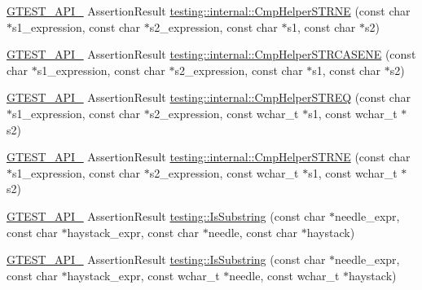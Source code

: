 \begin{DoxyCompactItemize}
\item 
\mbox{\hyperlink{_obj__test_2lib_2googletest-release-1_88_81_2googletest_2include_2gtest_2internal_2gtest-port_8h_aa73be6f0ba4a7456180a94904ce17790}{G\+T\+E\+S\+T\+\_\+\+A\+P\+I\+\_\+}} Assertion\+Result \mbox{\hyperlink{namespacetesting_1_1internal_af2d31c77ce73e1003a64bd7ca3564bbe}{testing\+::internal\+::\+Cmp\+Helper\+S\+T\+R\+NE}} (const char $\ast$s1\+\_\+expression, const char $\ast$s2\+\_\+expression, const char $\ast$s1, const char $\ast$s2)
\item 
\mbox{\hyperlink{_obj__test_2lib_2googletest-release-1_88_81_2googletest_2include_2gtest_2internal_2gtest-port_8h_aa73be6f0ba4a7456180a94904ce17790}{G\+T\+E\+S\+T\+\_\+\+A\+P\+I\+\_\+}} Assertion\+Result \mbox{\hyperlink{namespacetesting_1_1internal_a7e31d489f06ab8f6a81a7729f0c377e7}{testing\+::internal\+::\+Cmp\+Helper\+S\+T\+R\+C\+A\+S\+E\+NE}} (const char $\ast$s1\+\_\+expression, const char $\ast$s2\+\_\+expression, const char $\ast$s1, const char $\ast$s2)
\item 
\mbox{\hyperlink{_obj__test_2lib_2googletest-release-1_88_81_2googletest_2include_2gtest_2internal_2gtest-port_8h_aa73be6f0ba4a7456180a94904ce17790}{G\+T\+E\+S\+T\+\_\+\+A\+P\+I\+\_\+}} Assertion\+Result \mbox{\hyperlink{namespacetesting_1_1internal_ad351878f87634853c4eb005fe9b169a8}{testing\+::internal\+::\+Cmp\+Helper\+S\+T\+R\+EQ}} (const char $\ast$s1\+\_\+expression, const char $\ast$s2\+\_\+expression, const wchar\+\_\+t $\ast$s1, const wchar\+\_\+t $\ast$s2)
\item 
\mbox{\hyperlink{_obj__test_2lib_2googletest-release-1_88_81_2googletest_2include_2gtest_2internal_2gtest-port_8h_aa73be6f0ba4a7456180a94904ce17790}{G\+T\+E\+S\+T\+\_\+\+A\+P\+I\+\_\+}} Assertion\+Result \mbox{\hyperlink{namespacetesting_1_1internal_a415a953647bbc9469f062dc966061efb}{testing\+::internal\+::\+Cmp\+Helper\+S\+T\+R\+NE}} (const char $\ast$s1\+\_\+expression, const char $\ast$s2\+\_\+expression, const wchar\+\_\+t $\ast$s1, const wchar\+\_\+t $\ast$s2)
\item 
\mbox{\hyperlink{_obj__test_2lib_2googletest-release-1_88_81_2googletest_2include_2gtest_2internal_2gtest-port_8h_aa73be6f0ba4a7456180a94904ce17790}{G\+T\+E\+S\+T\+\_\+\+A\+P\+I\+\_\+}} Assertion\+Result \mbox{\hyperlink{namespacetesting_a390c4f66fe7e9098117eb77e5fffa4ad}{testing\+::\+Is\+Substring}} (const char $\ast$needle\+\_\+expr, const char $\ast$haystack\+\_\+expr, const char $\ast$needle, const char $\ast$haystack)
\item 
\mbox{\hyperlink{_obj__test_2lib_2googletest-release-1_88_81_2googletest_2include_2gtest_2internal_2gtest-port_8h_aa73be6f0ba4a7456180a94904ce17790}{G\+T\+E\+S\+T\+\_\+\+A\+P\+I\+\_\+}} Assertion\+Result \mbox{\hyperlink{namespacetesting_aa1c82529c7591d2a9fd016de45dd9113}{testing\+::\+Is\+Substring}} (const char $\ast$needle\+\_\+expr, const char $\ast$haystack\+\_\+expr, const wchar\+\_\+t $\ast$needle, const wchar\+\_\+t $\ast$haystack)

\end{DoxyCompactItemize}
